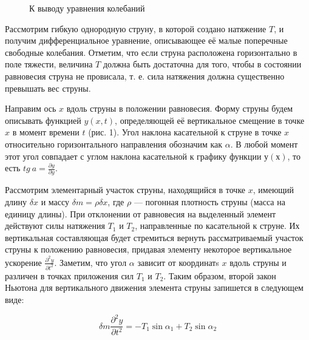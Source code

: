 \documentclass[14pt]{article}
\begin{document}
\begin{figure}[h!]
	\caption{К выводу уравнения колебаний}
	\label{fig:image}
\end{figure}

Рассмотрим гибкую однородную струну, в которой создано натяжение $T$, и получим дифференциальное уравнение, описывающее её малые поперечные свободные колебания. Отметим, что если струна расположена горизонтально в поле тяжести, величина $T$ должна быть достаточна для того, чтобы в
состоянии равновесия струна не провисала, т. е. сила натяжения должна существенно превышать вес струны.

Направим ось $x$ вдоль струны в положении равновесия. Форму струны будем описывать функцией $y(x, t)$, определяющей её вертикальное смещение в
точке $x$ в момент времени $t$ (рис. 1). Угол наклона касательной к струне в точке $x$ относительно горизонтального направления обозначим как 
$\alpha$. В любой момент этот угол совпадает с углом наклона касательной к графику функции $у(х)$, то есть 
$tg~a = \frac{\partial y}{\partial y}$.

Рассмотрим элементарный участок струны, находящийся в точке $x$, имеющий длину $\delta x$ и массу $\delta m = \rho \delta x$, где $\rho$ --- погонная плотность струны (масса на единицу длины). При отклонении от равновесия на выделенный элемент действуют силы натяжения $T_1$ и $T_2$, направленные по касательной к струне. Их вертикальная составляющая будет стремиться вернуть рассматриваемый участок струны к положению равновесия, придавая элементу некоторое вертикальное ускорение $\frac{\partial^2y}{\partial t^2}$. Заметим, что угол $\alpha$ зависит от координатs $x$ вдоль струны и различен в точках приложения сил $T_1$ и $T_2$. Таким образом, второй закон Ньютона для вертикального движения элемента струны запишется в следующем виде:

\begin{center}
\begin{equation}
\delta m \frac{\partial^2y}{\partial t^2} = -T_1\sin \alpha_1 + T_2\sin \alpha_2
\end{equation}
\end{center}
\end{document}
